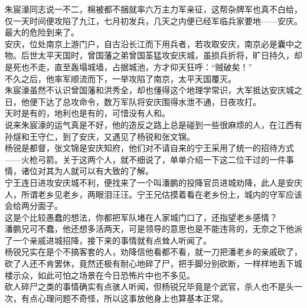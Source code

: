 \begin{multicols}{\theparacolNo}
朱宸濠同志说一不二，棉被都不捆就率六万主力军亲征，这帮杂牌军也真不白给，仅一天时间便攻陷了九江，七月初发兵，几天之内便已经军临兵家要地——安庆。\\

最大的危险到来了。\\

安庆，位处南京上游门户，自古沿长江而下用兵者，若攻取安庆，南京必是囊中之物。后世太平天国时，曾国藩之弟曾国荃猛攻安庆城，虽损兵折将，旷日持久，却是死也不走，直至轰塌城墙，占据城池，方才仰天狂呼：“贼破矣！”\\

不久之后，他率军顺流而下，一举攻陷了南京，太平天国覆灭。\\

朱宸濠虽然不认识曾国藩和洪秀全，却也懂得这个地理学常识，大军抵达安庆城之日，他便下达了总攻命令，数万军队将安庆围得水泄不通，日夜攻打。\\

天时是有的，地利也是有的，可惜没有人和。\\

说来朱宸濠的运气真是不好，他的造反之路上总是碰到一些很麻烦的人，在江西有孙燧和王守仁，到了安庆，又遇见了杨锐和张文锦。\\

杨锐是都督，张文锦是安庆知府，他们对不请自来的宁王采用了统一的招待方式——火枪弓箭。关于这两个人，就不细说了，单单介绍一下这二位干过的一件事情，诸位对其为人就可以有大致的了解。\\

宁王连日进攻安庆城不利，便找来了一个叫潘鹏的投降官员进城劝降，此人是安庆人，所谓老乡见老乡，两眼泪汪汪。宁王兄估摸着看在老乡份上，城内的守军应该会给两分面子。\\

这是个比较愚蠢的想法，你都把军队堵在人家城门口了，还指望老乡感情？\\

潘鹏兄可不蠢，他还想多活两天，可是领导的意思也是不能违背的，无奈之下他派了一个亲戚进城招降，接下来的事情就有点耸人听闻了。\\

杨锐兄实在是个不搞客套的人，劝降信他看都不看，就一刀把潘老乡的亲戚砍了，砍了人还不肯罢休，竟然还极有耐心地碎了尸，把手脚分别砍断，一样样地丢下城楼示众，如此可怕之场景在今日恐怖片中也不多见。\\

砍人碎尸之类的事情确实有点骇人听闻，但杨锐兄毕竟是个武官，杀人也不是头一次，有点心理问题不奇怪，所以这事放他身上也算基本正常。\\


\end{multicols}
